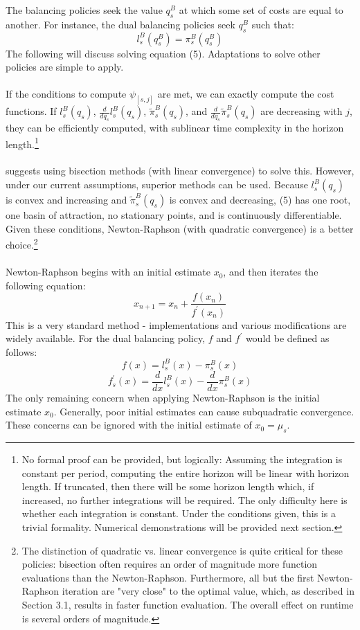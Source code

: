 \documentclass[12pt]{article}
\begin{document}
The balancing policies seek the value $q_s^B$ at which some set of costs are equal to another. For instance, the dual balancing policies seek $q_s^B$ such that:
\begin{equation}
	l_s^B(q_s^B) = \pi_s^B(q_s^B)
\end{equation}
The following will discuss solving equation (5). Adaptations to solve other policies are simple to apply. \\
\\
If the conditions to compute $\psi_{[s, j]}$ are met, we can exactly compute the cost functions. If $l_s^B(q_s)$, $\frac{d}{d q_s} l_s^B(q_s)$, $\tilde{\pi}_s^B(q_s)$, and $\frac{d}{d q_s} \tilde{\pi}_s^B(q_s)$ are decreasing with $j$, they can be efficiently computed, with sublinear time complexity in the horizon length.\footnote{No formal proof can be provided, but logically: Assuming the integration is constant per period, computing the entire horizon will be linear with horizon length. If truncated, then there will be some horizon length which, if increased, no further integrations will be required. The only difficulty here is whether each integration is constant. Under the conditions given, this is a trivial formality. Numerical demonstrations will be provided next section.} \\
\\
\cite{levi:2007} suggests using bisection methods (with linear convergence) to solve this. However, under our current assumptions, superior methods can be used. Because $l_s^B(q_s)$ is convex and increasing and $\tilde{\pi}_s^B(q_s)$ is convex and decreasing, (5) has one root, one basin of attraction, no stationary points, and is continuously differentiable. Given these conditions, Newton-Raphson (with quadratic convergence) is a better choice.\footnote{The distinction of quadratic vs. linear convergence is quite critical for these policies: bisection often requires an order of magnitude more function evaluations than the Newton-Raphson. Furthermore, all but the first Newton-Raphson iteration are "very close" to the optimal value, which, as described in Section 3.1, results in faster function evaluation. The overall effect on runtime is several orders of magnitude.}\\
\\
Newton-Raphson begins with an initial estimate $x_0$, and then iterates the following equation:
$$
	x_{n+1} = x_n + \frac{f(x_n)}{f^{\prime}(x_n)}
$$
This is a very standard method - implementations and various modifications are widely available. For the dual balancing policy, $f$ and $f^{\prime}$ would be defined as follows:
$$
	f(x) = l_s^B(x) - \pi_s^B(x) 
$$
$$
	f_s^{\prime}(x) =  \frac{d}{dx} l_s^B(x) - \frac{d}{dx} \pi_s^B(x) 
$$
The only remaining concern when applying Newton-Raphson is the initial estimate $x_0$. Generally, poor initial estimates can cause subquadratic convergence. These concerns can be ignored with the initial estimate of $x_0 = \mu_s$.
\end{document}
